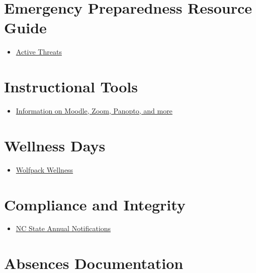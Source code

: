 \documentclass[
]{book}
\providecommand{\tightlist}{%
  \setlength{\itemsep}{0pt}\setlength{\parskip}{0pt}}
\begin{document}
\hypertarget{emergency-preparedness-resource-guide}{%
\section{Emergency Preparedness Resource Guide}\label{emergency-preparedness-resource-guide}}

\begin{itemize}
\tightlist
\item
  \href{https://docs.google.com/document/d/1mIo_5NfuIwv8UYRubB7fdnDF1jShu14y3uZkY0gjX1Q/edit?usp=sharing}{Active Threats}
\end{itemize}

\hypertarget{instructional-tools}{%
\section{Instructional Tools}\label{instructional-tools}}

\begin{itemize}
\tightlist
\item
  \href{https://delta.ncsu.edu/learning-technology/instructional-tools/}{Information on Moodle, Zoom, Panopto, and more}
\end{itemize}

\hypertarget{wellness-days}{%
\section{Wellness Days}\label{wellness-days}}

\begin{itemize}
\tightlist
\item
  \href{https://wellness.ncsu.edu/wellness-day/}{Wolfpack Wellness}
\end{itemize}

\hypertarget{compliance-and-integrity}{%
\section{Compliance and Integrity}\label{compliance-and-integrity}}

\begin{itemize}
\tightlist
\item
  \href{https://compliance.ncsu.edu/annual-notices/?utm_source=newsletter\&utm_medium=email\&utm_campaign=annual-campus-notifications}{NC State Annual Notifications}
\end{itemize}

\hypertarget{absences-documentation}{%
\section{Absences Documentation}\label{absences-documentation}}
\end{document}
